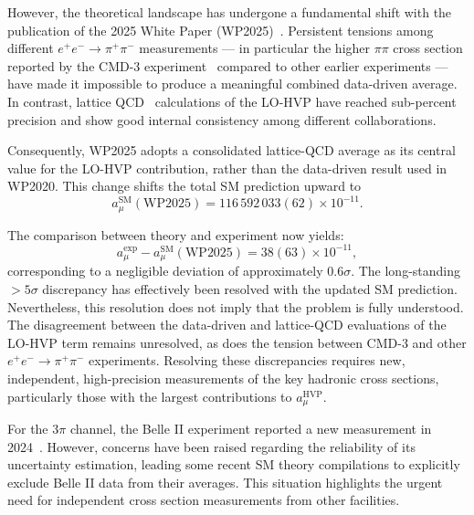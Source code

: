 However, the theoretical landscape has undergone a fundamental shift with the publication of the 2025 White Paper (WP2025)~\cite{WP2025}. Persistent tensions among different \(e^+e^-\to\pi^+\pi^-\) measurements --- in particular the higher \(\pi\pi\) cross section reported by the CMD-3 experiment~\cite{CMD3_Ignatov2024} compared to other earlier experiments --- have made it impossible to produce a meaningful combined data-driven average. In contrast, lattice QCD~\cite{Borsanyi2021} calculations of the LO-HVP have reached sub-percent precision and show good internal consistency among different collaborations.

Consequently, WP2025 adopts a consolidated lattice-QCD average as its central value for the LO-HVP contribution, rather than the data-driven result used in WP2020. This change shifts the total SM prediction upward to
\[
a_\mu^{\mathrm{SM}}(\mathrm{WP2025}) = 116\,592\,033(62) \times 10^{-11}.
\]

The comparison between theory and experiment now yields:
\[
a_\mu^{\mathrm{exp}} - a_\mu^{\mathrm{SM}}(\mathrm{WP2025}) = 38(63) \times 10^{-11},
\]
corresponding to a negligible deviation of approximately \(0.6\sigma\). The long-standing \(>5\sigma\) discrepancy has effectively been resolved with the updated SM prediction. Nevertheless, this resolution does not imply that the problem is fully understood. The disagreement between the data-driven and lattice-QCD evaluations of the LO-HVP term remains unresolved, as does the tension between CMD-3 and other \(e^+e^-\to\pi^+\pi^-\) experiments. Resolving these discrepancies requires new, independent, high-precision measurements of the key hadronic cross sections, particularly those with the largest contributions to \(a_\mu^{\mathrm{HVP}}\).


For the \(3\pi\) channel, the Belle II experiment reported a new measurement in 2024~\cite{BelleII_3pi_2024}. However, concerns have been raised regarding the reliability of its uncertainty estimation, leading some recent SM theory compilations to explicitly exclude Belle II data from their averages\cite{Hoferichter2025}. This situation highlights the urgent need for independent cross section measurements from other facilities.

